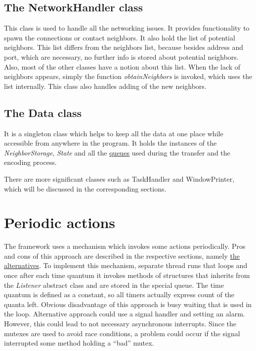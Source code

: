 \subsection{The NetworkHandler class}\label{the-networkhandler-class}

This class is used to handle all the networking issues. It provides
functionality to spawn the connections or contact neighbors. It also
hold the list of potential neighbors. This list differs from the
neighbors list, because besides address and port, which are necessary,
no further info is stored about potential neighbors. Also, most of the
other classes have a notion about this list. When the lack of neighbors
appears, simply the function \textit{obtainNeighbors} is invoked, which
uses the list internally. This class also handles adding of the new
neighbors.

\subsection{The Data class}\label{the-data-class}

It is a singleton class which helps to keep all the data at one place
while accessible from anywhere in the program. It holds the instances of
the \textit{NeighborStorage}, \textit{State} and all the
\hyperref[queues]{queues} used during the transfer and the encoding
process.

There are more significant classes such as TaskHandler and
WindowPrinter, which will be discussed in the corresponding sections.

\section{Periodic actions}\label{periodic-actions}

The framework uses a mechanism which invokes some actions periodically.
Pros and cons of this approach are described in the respective sections,
namely
\hyperref[problems-alternatives-and-possible-improvements]{the alternatives}.
To implement this mechanism, separate thread runs that loops and once
after each time quantum it invokes methods of structures that inherits
from the \textit{Listener} abstract class and are stored in the special
queue. The time quantum is defined as a constant, so all timers actually
express count of the quanta left. Obvious disadvantage of this approach
is busy waiting that is used in the loop. Alternative approach could use
a signal handler and setting an alarm. However, this could lead to not
necessary asynchronous interrupts. Since the mutexes are used to avoid
race conditions, a problem could occur if the signal interrupted some
method holding a ``bad'' mutex.

